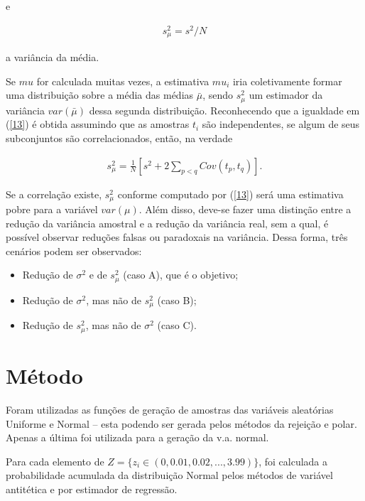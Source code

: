 \documentclass[
]{article}
\providecommand{\tightlist}{%
  \setlength{\itemsep}{0pt}\setlength{\parskip}{0pt}}
\begin{document}
e

\begin{align}
s^2_\mu = s^2/N \label{13}
\end{align}

a variância da média.

Se \(mu\) for calculada muitas vezes, a estimativa \(mu_i\) iria
coletivamente formar uma distribuição sobre a média das médias
\(\bar{\mu}\), sendo \(s^2_\mu\) um estimador da variância
\(var(\bar{\mu})\) dessa segunda distribuição. Reconhecendo que a
igualdade em (\ref{13}) é obtida assumindo que as amostras \(t_i\) são
independentes, se algum de seus subconjuntos são correlacionados, então,
na verdade

\begin{align}
s^2_\mu = \frac{1}{N} \left[ s^2 + 2 \sum\limits_{p<q} Cov(t_p, t_q) \right].
\end{align}

Se a correlação existe, \(s^2_\mu\) conforme computado por (\ref{13})
será uma estimativa pobre para a variável \(var(\mu)\). Além disso,
deve-se fazer uma distinção entre a redução da variância amostral e a
redução da variância real, sem a qual, é possível observar reduções
falsas ou paradoxais na variância. Dessa forma, três cenários podem ser
observados:

\begin{itemize}
\tightlist
\item
  Redução de \(\sigma^2\) e de \(s^2_\mu\) (caso A), que é o objetivo;
\item
  Redução de \(\sigma^2\), mas não de \(s^2_\mu\) (caso B);
\item
  Redução de \(s^2_\mu\), mas não de \(\sigma^2\) (caso C).
\end{itemize}

\hypertarget{muxe9todo}{%
\section{Método}\label{muxe9todo}}

Foram utilizadas as funções de geração de amostras das variáveis
aleatórias Uniforme e Normal -- esta podendo ser gerada pelos métodos da
rejeição e polar. Apenas a última foi utilizada para a geração da v.a.
normal.

Para cada elemento de \(Z = \{ z_i \in (0, 0.01, 0.02, ..., 3.99) \}\),
foi calculada a probabilidade acumulada da distribuição Normal pelos
métodos de variável antitética e por estimador de regressão.
\end{document}
